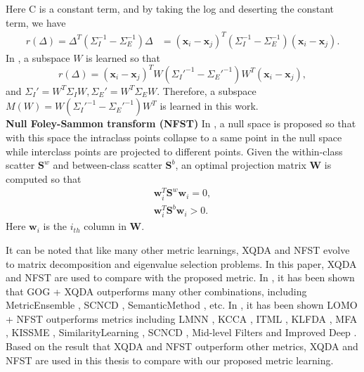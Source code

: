 Here C is a constant term, and by taking the log and deserting the constant term, we have 
\begin{equation}
\begin{aligned}
r(\Delta) = \Delta^T(\Sigma_I^{-1} - \Sigma_E^{-1})\Delta 
	   & = (\bm{x}_i - \bm{x}_j)^T(\Sigma_I^{-1} - \Sigma_E^{-1})(\bm{x}_i - \bm{x}_j).
\end{aligned}
\end{equation}
In \cite{LOMO}, a subspace $W$ is learned so that 
\begin{equation}
r(\Delta) = (\bm{x}_i - \bm{x}_j)^TW({\Sigma_I}'^{-1} - {\Sigma_E}'^{-1})W^T(\bm{x}_i - \bm{x}_j),
\end{equation}
and ${\Sigma_I}' = W^T\Sigma_IW, {\Sigma_E}' = W^T\Sigma_EW$. Therefore, a subspace $M(W) = W({\Sigma_I}'^{-1} - {\Sigma_E}'^{-1})W^T$ is learned in this work.\\
\indent \textbf{Null Foley-Sammon transform (NFST)} In \cite{NFST}, a null space is proposed so that with this space the intraclass points collapse to a same point in the null space while interclass points are projected to different points. Given the within-class scatter $\bm{S}^w$ and between-class scatter $\bm{S}^b$, an optimal projection matrix $\bm{W}$ is computed so that 
\begin{equation}
\begin{aligned}
\bm{w}_i^T\bm{S}^w\bm{w}_i = 0,\\
\bm{w}_i^T\bm{S}^b\bm{w}_i > 0.
\end{aligned}
\end{equation}
Here $\bm{w}_i$ is the $i_{th}$ column in $\bm{W}$.

It can be noted that like many other metric learnings, XQDA and NFST evolve to matrix decomposition and eigenvalue selection problems. In this paper, XQDA and NFST are used to compare with the proposed metric. In \cite{GOG}, it has been shown that GOG + XQDA outperforms many other combinations, including MetricEnsemble \cite{MetricEnsembles}, SCNCD \cite{SCNCD}, SemanticMethod \cite{SemanticMethod}, etc. In \cite{ NFST}, it has been shown LOMO + NFST outperforms metrics including LMNN \cite{LMNN}, KCCA \cite{KCCA}, ITML \cite{ITML}, KLFDA \cite{KLFDA}, MFA \cite{KernelVersionMetrics}, KISSME \cite{KISSME}, SimilarityLearning \cite{SimilarityLearning}, SCNCD \cite{SCNCD}, Mid-level Filters \cite{MidlevelFilters} and Improved Deep \cite{ImprovedCNN}. Based on the result that XQDA and NFST outperform other metrics, XQDA and NFST are used in this thesis to compare with our proposed metric learning. 

